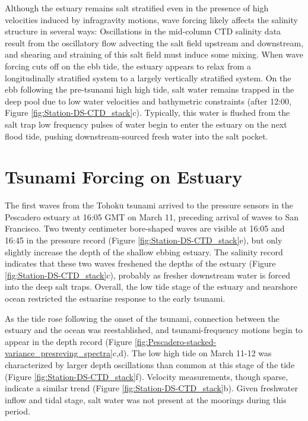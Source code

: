 Although the estuary remains salt stratified even in the presence
of high velocities induced by infragravity motions, wave forcing likely
affects the salinity structure in several ways: Oscillations in the
mid-column CTD salinity data result from the oscillatory flow advecting
the salt field upstream and downstream, and shearing and straining
of this salt field must induce some mixing. When wave forcing cuts
off on the ebb tide, the estuary appears to relax from a longitudinally
stratified system to a largely vertically stratified system. On the
ebb following the pre-tsunami high high tide, salt water remains trapped
in the deep pool due to low water velocities and bathymetric constraints
(after 12:00, Figure \ref{fig:Station-DS-CTD_stack}c). Typically,
this water is flushed from the salt trap low frequency pulses of water
begin to enter the estuary on the next flood tide, pushing downstream-sourced
fresh water into the salt pocket. 


\section{Tsunami Forcing on Estuary}

The first waves from the Tohok$\overline{\mathrm{u}}$ tsunami arrived to the pressure sensors
in the Pescadero estuary at 16:05 GMT on March 11, preceding arrival
of waves to San Francisco. Two twenty centimeter bore-shaped waves
are visible at 16:05 and 16:45 in the pressure record (Figure \ref{fig:Station-DS-CTD_stack}e),
but only slightly increase the depth of the shallow ebbing estuary.
The salinity record indicates that these two waves freshened the depths
of the estuary (Figure \ref{fig:Station-DS-CTD_stack}c), probably
as fresher downstream water is forced into the deep salt traps. Overall,
the low tide stage of the estuary and nearshore ocean restricted the
estuarine response to the early tsunami. 

As the tide rose following the onset of the tsunami, connection between
the estuary and the ocean was reestablished, and tsunami-frequency
motions begin to appear in the depth record (Figure \ref{fig:Pescadero-stacked-variance_presreving_spectra}c,d).
The low high tide on March 11-12 was characterized by larger depth
oscillations than common at this stage of the tide (Figure \ref{fig:Station-DS-CTD_stack}f).
Velocity measurements, though sparse, indicate a similar trend (Figure
\ref{fig:Station-DS-CTD_stack}b). Given freshwater inflow and tidal
stage, salt water was not present at the moorings during this period. 

